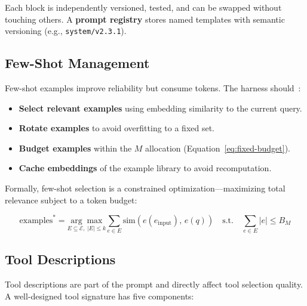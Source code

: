 Each block is independently versioned, tested, and can be swapped without touching others. A \textbf{prompt registry} stores named templates with semantic versioning (e.g., \texttt{system/v2.3.1}).

\subsection{Few-Shot Management}
\label{few-shot-management}

Few-shot examples improve reliability but consume tokens. The harness should~\cite{liu2022makes}:

\begin{itemize}
  \item \textbf{Select relevant examples} using embedding similarity to the current query.
  \item \textbf{Rotate examples} to avoid overfitting to a fixed set.
  \item \textbf{Budget examples} within the $M$ allocation (Equation~\ref{eq:fixed-budget}).
  \item \textbf{Cache embeddings} of the example library to avoid recomputation.
\end{itemize}

Formally, few-shot selection is a constrained optimization---maximizing total relevance subject to a token budget:

\begin{equation}
\text{examples}^* = \underset{E \subseteq \mathcal{E},\; |E| \leq k}{\arg\max} \sum_{e \in E} \text{sim}(e(e_{\text{input}}),\, e(q)) \quad \text{s.t.} \quad \sum_{e \in E} |e| \leq B_M
\end{equation}

\subsection{Tool Descriptions}
\label{tool-descriptions}

Tool descriptions are part of the prompt and directly affect tool selection quality. A well-designed tool signature has five components:

